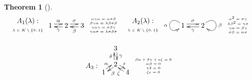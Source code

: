 \documentclass[12pt]{amsart}
\newtheorem{thm}{Theorem}[section]
\numberwithin{equation}{thm}
\begin{document}
{\begin{thm}[{\cite[Theorem, Theorem]{S}}]
\[\begin{array}{c}
\begin{array}{c}
A_1(\lambda):\\
{\text {\tiny $\lambda\in K\setminus\{0,1\}$}}\\
\end{array}
\begin{xy}
(0,0) *[o]+{1}="A", (8,0)*[o]+{2}="B", (16,0)*[o]+{3}="C",
\ar @<2pt> "A";"B"^{\alpha}
\ar @<2pt> "B";"A"^{\gamma}
\ar @<2pt> "B";"C"^{\sigma }
\ar @<2pt> "C";"B"^{\beta}
\end{xy}
{\tiny \begin{array}{c}
\alpha\gamma\alpha=\alpha\sigma\beta\\
\beta\gamma\alpha=\lambda\beta\sigma\beta\\
  \gamma\alpha\gamma=\sigma\beta\gamma \\
 \gamma\alpha\sigma=\lambda\sigma\beta\sigma \\
\end{array}
}
\hspace{5pt}
 \begin{array}{c}
A_2(\lambda):\\
{\text {\tiny $\lambda\in K\setminus\{0,1\}$}}\\
\end{array}

\begin{xy}
(0,0) *[o]+{1}="A", (10,0)*[o]+ {2}="B",
\ar @(lu,ld) "A";"A"_{\alpha}
\ar @(ru,rd) "B";"B"^{\beta}
\ar @<2pt> "A";"B"^{\sigma}
\ar @<2pt> "B";"A"^{\gamma}
\end{xy}
\tiny{ \begin{array}{c}
  \alpha^2=\sigma\gamma \\
 \lambda\beta^2=\gamma\sigma \\
 \gamma\alpha=\beta\gamma \\
 \sigma\beta=\alpha\sigma \\
\end{array}
}


\\\\
\begin{array}{lll}

A_3:
\begin{xy}
(0,-3)*[o]+{1}="A", (6,1)*[o]+{2}="B", (6,9)*[o]+{3}="C", (12,-3)*[o]+{4}="D", 
\ar @<2pt>"A";"B"^{\alpha}
\ar @<2pt>"B";"A"^{\beta}
\ar @<2pt>"B";"C"^{\delta}
\ar @<2pt>"C";"B"^{\gamma}
\ar @<2pt>"B";"D"^{\epsilon}
\ar @<2pt>"D";"B"^{\zeta}
\end{xy}
{\tiny \begin{array}{c}
  \beta\alpha+\delta\gamma+\epsilon\zeta=0 \\
  \alpha\beta=0 \\
  \gamma\delta=0 \\
 \zeta\epsilon=0 \\
 \end{array}
}


\end{array}
\end{array}\]
\end{thm}}
\end{document}

